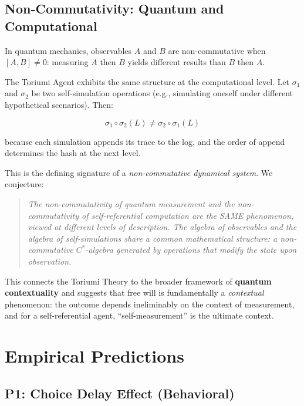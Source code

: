 \documentclass[12pt,a4paper]{article}
\theoremstyle{definition}
\theoremstyle{remark}
\begin{document}
\subsection{Non-Commutativity: Quantum and Computational}

In quantum mechanics, observables $A$ and $B$ are non-commutative when
$[A, B] \neq 0$: measuring $A$ then $B$ yields different results than
$B$ then $A$.

The Toriumi Agent exhibits the same structure at the computational level. Let
$\sigma_1$ and $\sigma_2$ be two self-simulation operations (e.g., simulating
oneself under different hypothetical scenarios). Then:

\begin{equation}
\sigma_1 \circ \sigma_2 (L) \neq \sigma_2 \circ \sigma_1 (L)
\end{equation}

because each simulation appends its trace to the log, and the order of
append determines the hash at the next level.

This is the defining signature of a \emph{non-commutative dynamical system}.
We conjecture:

\begin{quote}
\textit{The non-commutativity of quantum measurement and the non-commutativity
of self-referential computation are the SAME phenomenon, viewed at different
levels of description. The algebra of observables and the algebra of
self-simulations share a common mathematical structure: a non-commutative
$C^*$-algebra generated by operations that modify the state upon observation.}
\end{quote}

This connects the Toriumi Theory to the broader framework of
\textbf{quantum contextuality} \cite{kochen1967} and suggests that free will
is fundamentally a \emph{contextual} phenomenon: the outcome depends
ineliminably on the context of measurement, and for a self-referential agent,
``self-measurement'' is the ultimate context.

\section{Empirical Predictions}
\label{sec:predictions}

\subsection{P1: Choice Delay Effect (Behavioral)}
\end{document}
